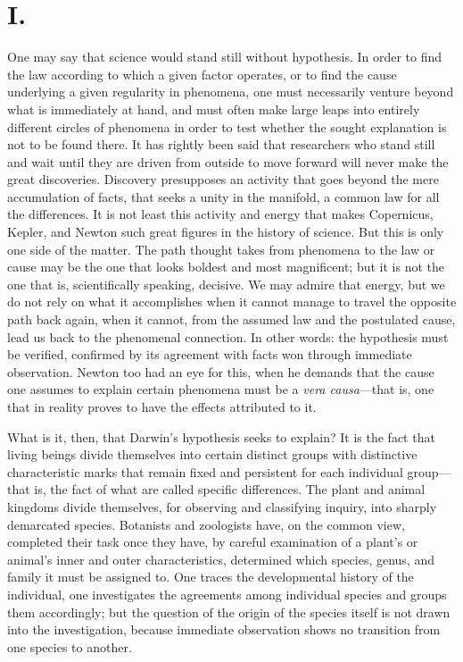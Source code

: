 \documentclass[12pt,a4paper]{article}
\begin{document}
\section*{I.}

One may say that science would stand still without hypothesis. In
order to find the law according to which a given factor operates, or
to find the cause underlying a given regularity in phenomena, one
must necessarily venture beyond what is immediately at hand, and
must often make large leaps into entirely different circles of
phenomena in order to test whether the sought explanation is not to
be found there. It has rightly been said that researchers who stand
still and wait until they are driven from outside to move forward
will never make the great discoveries. Discovery presupposes an
activity that goes beyond the mere accumulation of facts, that seeks
a unity in the manifold, a common law for all the differences. It is
not least this activity and energy that makes Copernicus, Kepler, and
Newton such great figures in the history of science. But this is only
one side of the matter. The path thought takes from phenomena to the
law or cause may be the one that looks boldest and most magnificent;
but it is not the one that is, scientifically speaking, decisive. We
may admire that energy, but we do not rely on what it accomplishes
when it cannot manage to travel the opposite path back again, when it
cannot, from the assumed law and the postulated cause, lead us back
to the phenomenal connection. In other words: the hypothesis must be
verified, confirmed by its agreement with facts won through immediate
observation. Newton too had an eye for this, when he demands that the
cause one assumes to explain certain phenomena must be a \textit{vera
causa}---that is, one that in reality proves to have the effects
attributed to it.

What is it, then, that Darwin's hypothesis seeks to explain? It is
the fact that living beings divide themselves into certain distinct
groups with distinctive characteristic marks that remain fixed and
persistent for each individual group---that is, the fact of what are
called specific differences. The plant and animal kingdoms divide
themselves, for observing and classifying inquiry, into sharply
demarcated species. Botanists and zoologists have, on the common view,
completed their task once they have, by careful examination of a
plant's or animal's inner and outer characteristics, determined which
species, genus, and family it must be assigned to. One traces the
developmental history of the individual, one investigates the
agreements among individual species and groups them accordingly; but
the question of the origin of the species itself is not drawn into the
investigation, because immediate observation shows no transition from
one species to another.
\end{document}
